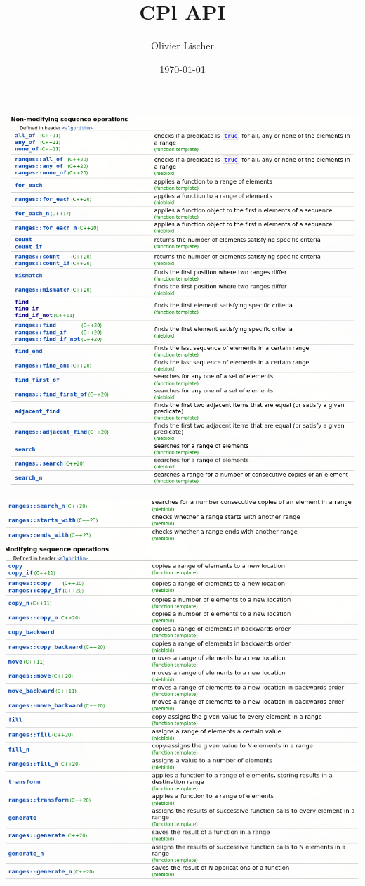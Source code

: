 \documentclass[11pt,twoside,twocolumn,landscape]{article}
\author{Olivier Lischer}
\date{\today}
\title{CPl API}
\begin{document}
\pagestyle{fancy}
\fancyhf{}
\fancyfoot[CE,CO]{\leftmark}
\fancyfoot[R]{\thepage}


\begin{center}
\includegraphics[width=.9\linewidth]{img/algorithm_1.png}
\end{center}
\begin{center}
\includegraphics[width=.9\linewidth]{img/algorithm_2.png}
\end{center}
\end{document}
